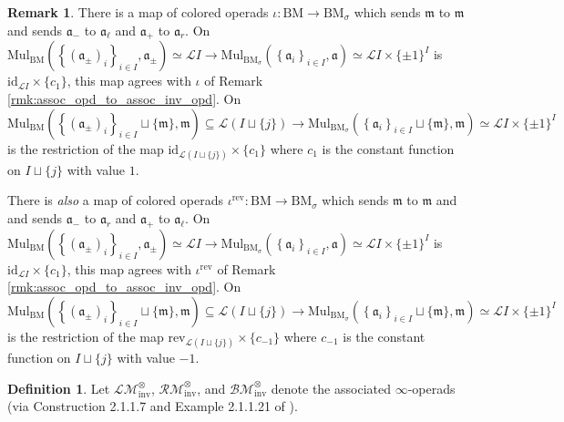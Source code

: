 \documentclass{article}
\theoremstyle{definition}
\newtheorem{definition}[theorem]{Definition}
\newtheorem{remark}[theorem]{Remark}
\begin{document}
\begin{remark}\label{rmk:bimod_opd_to_inv_bimod_opd}
    There is a map of colored operads $ \iota \colon \mathrm{BM} \to \mathrm{BM}_{\sigma} $ which sends $ \mathfrak{m} $ to $ \mathfrak{m} $ and sends $ \mathfrak{a}_{-} $ to $ \mathfrak{a}_\ell $ and $ \mathfrak{a}_+ $ to $ \mathfrak{a}_r $. 
    On $ \mathrm{Mul}_{\mathrm{BM}}\left(\left\{(\mathfrak{a}_{\pm})_i\right\}_{i \in I}, \mathfrak{a}_{\pm}\right) \simeq  \mathcal{L}I \to \mathrm{Mul}_{\mathrm{BM}_\sigma}\left(\left\{\mathfrak{a}_i\right\}_{i \in I}, \mathfrak{a}\right) \simeq  \mathcal{L}I \times \{\pm 1\}^I $  is $ \mathrm{id}_{\mathcal{L}I} \times \{ c_1\} $, this map agrees with $ \iota $ of Remark \ref{rmk:assoc_opd_to_assoc_inv_opd}. 
    On $ \mathrm{Mul}_{\mathrm{BM}}\left(\left\{(\mathfrak{a}_{\pm})_i\right\}_{i \in I} \sqcup\{\mathfrak{m}\}, \mathfrak{m}\right) \subseteq  \mathcal{L}(I\sqcup \{j\}) \to \mathrm{Mul}_{\mathrm{BM}_\sigma}\left(\left\{\mathfrak{a}_i\right\}_{i \in I} \sqcup \{\mathfrak{m}\}, \mathfrak{m}\right) \simeq  \mathcal{L}I \times \{\pm 1\}^I $ is the restriction of the map $ \mathrm{id}_{\mathcal{L}(I\sqcup \{j\})} \times \{ c_1\} $ where $ c_1 $ is the constant function on $ I \sqcup \{j\} $ with value $ 1 $. 

    There is \emph{also} a map of colored operads $ \iota^{\mathrm{rev}} \colon \mathrm{BM} \to \mathrm{BM}_{\sigma} $ which sends $ \mathfrak{m} $ to $ \mathfrak{m} $ and  and sends $ \mathfrak{a}_{-} $ to $ \mathfrak{a}_r $ and $ \mathfrak{a}_+ $ to $ \mathfrak{a}_\ell $. 
    On $ \mathrm{Mul}_{\mathrm{BM}}\left(\left\{(\mathfrak{a}_{\pm})_i\right\}_{i \in I}, \mathfrak{a}_{\pm}\right) \simeq  \mathcal{L}I \to \mathrm{Mul}_{\mathrm{BM}_\sigma}\left(\left\{\mathfrak{a}_i\right\}_{i \in I}, \mathfrak{a}\right) \simeq  \mathcal{L}I \times \{\pm 1\}^I $  is $ \mathrm{id}_{\mathcal{L}I} \times \{ c_1\} $, this map agrees with $ \iota^{\mathrm{rev}} $ of Remark \ref{rmk:assoc_opd_to_assoc_inv_opd}. 
    On $ \mathrm{Mul}_{\mathrm{BM}}\left(\left\{(\mathfrak{a}_{\pm})_i\right\}_{i \in I} \sqcup\{\mathfrak{m}\}, \mathfrak{m}\right) \subseteq  \mathcal{L}(I\sqcup \{j\}) \to \mathrm{Mul}_{\mathrm{BM}_\sigma}\left(\left\{\mathfrak{a}_i\right\}_{i \in I} \sqcup \{\mathfrak{m}\}, \mathfrak{m}\right) \simeq  \mathcal{L}I \times \{\pm 1\}^I $ is the restriction of the map $ \mathrm{rev}_{\mathcal{L}(I\sqcup \{j\})} \times \{ c_{-1}\} $ where $ c_{-1} $ is the constant function on $ I \sqcup \{j\} $ with value $ -1 $. 
\end{remark}
\begin{definition}
    Let $ \mathcal{LM}_\mathrm{inv}^\otimes $, $ \mathcal{RM}_\mathrm{inv}^\otimes $, and $ \mathcal{BM}_\mathrm{inv}^\otimes $ denote the associated $ \infty $-operads (via Construction 2.1.1.7 and Example 2.1.1.21 of \cite{LurHA}).
\end{definition}
\end{document}
